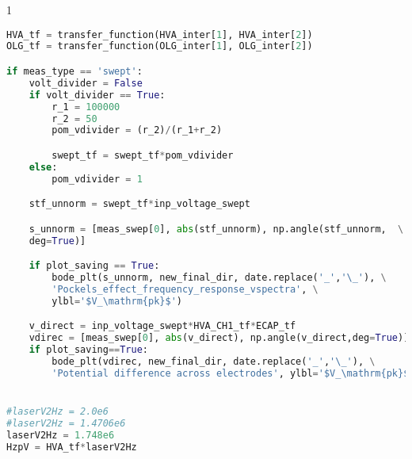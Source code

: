 \begin{spacing}{1} \begin{lstlisting}[frame=single, language=Python]
HVA_tf = transfer_function(HVA_inter[1], HVA_inter[2])                       # combine amplitude and phase of HVACH3 and OLG
OLG_tf = transfer_function(OLG_inter[1], OLG_inter[2])

if meas_type == 'swept':
    volt_divider = False                                                     # Voltage divider if you want a smaller normalization factor
    if volt_divider == True:                                                 # Voltage divider with r_1 as the first resistor and r_2 as the resistor connected to ground
        r_1 = 100000
        r_2 = 50
        pom_vdivider = (r_2)/(r_1+r_2)

        swept_tf = swept_tf*pom_vdivider
    else:
        pom_vdivider = 1

    stf_unnorm = swept_tf*inp_voltage_swept                                  # Unnormalized transfer function measurement

    s_unnorm = [meas_swep[0], abs(stf_unnorm), np.angle(stf_unnorm,  \
    deg=True)]                                                               # Unnormalized transfer function in triad format

    if plot_saving == True:                                                  # Plot voltage spectra for transfer function measurement if requested
        bode_plt(s_unnorm, new_final_dir, date.replace('_','\_'), \
        'Pockels_effect_frequency_response_vspectra', \
        ylbl='$V_\mathrm{pk}$')

    v_direct = inp_voltage_swept*HVA_CH1_tf*ECAP_tf                          # This is the voltage directly across the coating for all measured frequencies (with phase information)
    vdirec = [meas_swep[0], abs(v_direct), np.angle(v_direct,deg=True)]      # Frequency dependent injection voltage (transfer function triad)
    if plot_saving==True:                                                    # Plot frequency dependent injection voltage if requested
        bode_plt(vdirec, new_final_dir, date.replace('_','\_'), \
        'Potential difference across electrodes', ylbl='$V_\mathrm{pk}$')


#laserV2Hz = 2.0e6
#laserV2Hz = 1.4706e6                                                        # measurement from elog 831 (05-24-2021)
laserV2Hz = 1.748e6                                                          # Laser PZT response acquired from PDH measurement
HzpV = HVA_tf*laserV2Hz                                                      # Actuation function A(f) = A_1(f)*A_2(f)


\end{lstlisting}
\end{spacing}
